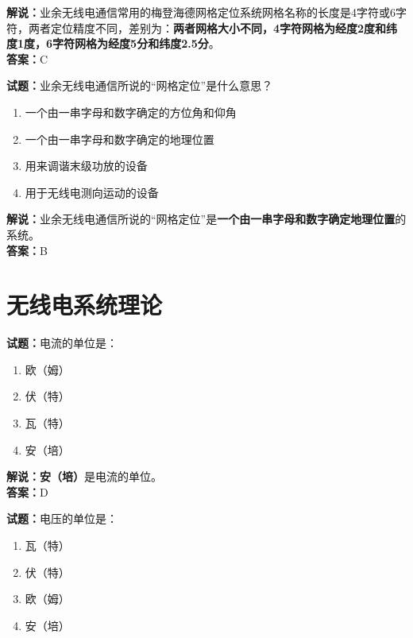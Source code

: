 \documentclass{ctexbook}
\begin{document}
\noindent\textbf{解说：}业余无线电通信常用的梅登海德网格定位系统网格名称的长度是4字符或6字符，两者定位精度不同，差别为：\textbf{两者网格大小不同，4字符网格为经度2度和纬度1度，6字符网格为经度5分和纬度2.5分}。\\\noindent\textbf{答案：}C

\vspace{\baselineskip}

\noindent\textbf{试题：}业余无线电通信所说的“网格定位”是什么意思？

\begin{enumerate}[leftmargin=3em]
  \item 一个由一串字母和数字确定的方位角和仰角
  \item 一个由一串字母和数字确定的地理位置 %
  \item 用来调谐末级功放的设备
  \item 用于无线电测向运动的设备
\end{enumerate}

\noindent\textbf{解说：}业余无线电通信所说的“网格定位”是\textbf{一个由一串字母和数字确定地理位置}的系统。\\\noindent\textbf{答案：}B



\chapter{无线电系统理论}

\newpage

\noindent\textbf{试题：}电流的单位是：

\begin{enumerate}[leftmargin=3em]
  \item 欧（姆）
  \item 伏（特）
  \item 瓦（特）
  \item 安（培）
\end{enumerate}

\noindent\textbf{解说：}\textbf{安（培）}是电流的单位。\\
\noindent\textbf{答案：}D

\vspace{\baselineskip}

\noindent\textbf{试题：}电压的单位是：

\begin{enumerate}[leftmargin=3em]
  \item 瓦（特）
  \item 伏（特）
  \item 欧（姆）
  \item 安（培）
\end{enumerate}
\end{document}
